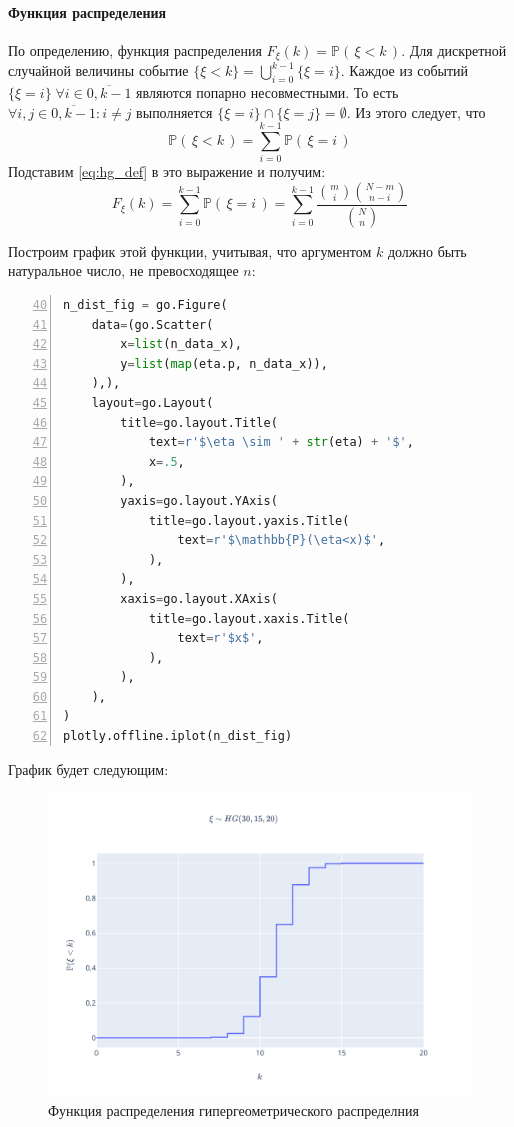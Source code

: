 \documentclass[
  russian,
  a4paper,
]{article}
\let\oldparagraph\paragraph
\renewcommand{\paragraph}[1]{\oldparagraph{#1}\mbox{}}
\begin{document}
\hypertarget{ux444ux443ux43dux43aux446ux438ux44f-ux440ux430ux441ux43fux440ux435ux434ux435ux43bux435ux43dux438ux44f}{%
\paragraph{Функция
распределения}\label{ux444ux443ux43dux43aux446ux438ux44f-ux440ux430ux441ux43fux440ux435ux434ux435ux43bux435ux43dux438ux44f}}

По определению, функция распределения
\(F_\xi(k) = \mathbb{P}\left(\, \xi < k \,\right)\). Для дискретной
случайной величины событие
\(\{\xi < k\} = \bigcup\limits_{i=0}^{k-1}\{\xi=i\}\). Каждое из событий
\(\{\xi=i\}\; \forall i \in \overline{0, k-1}\) являются попарно
несовместными. То есть \(\forall i,j \in \overline{0, k-1}: i \neq j\)
выполняется \(\{\xi=i\}\cap\{\xi=j\}=\emptyset\). Из этого следует, что
\[\mathbb{P}\left(\, \xi < k \,\right) = \sum_{i=0}^{k-1}\mathbb{P}\left(\, \xi = i \,\right)\]
Подставим \ref{eq:hg_def} в это выражение и получим: \[F_\xi(k)
= \sum_{i=0}^{k-1}\mathbb{P}\left(\, \xi = i \,\right)
= \sum_{i=0}^{k-1}\frac{\binom{m}{i}\binom{N-m}{n-i}}{\binom{N}{n}}\]

Построим график этой функции, учитывая, что аргументом \(k\) должно быть
натуральное число, не превосходящее \(n\):

\begin{lstlisting}[language=Python, numbers=left, firstnumber=40]
n_dist_fig = go.Figure(
    data=(go.Scatter(
        x=list(n_data_x),
        y=list(map(eta.p, n_data_x)),
    ),),
    layout=go.Layout(
        title=go.layout.Title(
            text=r'$\eta \sim ' + str(eta) + '$',
            x=.5,
        ),
        yaxis=go.layout.YAxis(
            title=go.layout.yaxis.Title(
                text=r'$\mathbb{P}(\eta<x)$',
            ),
        ),
        xaxis=go.layout.XAxis(
            title=go.layout.xaxis.Title(
                text=r'$x$',
            ),
        ),
    ),
)
plotly.offline.iplot(n_dist_fig)
\end{lstlisting}

График будет следующим:

\begin{figure}
\centering
\includegraphics{../assets/hg_dist.svg}
\caption{Функция распределения гипергеометрического распределния}
\end{figure}
\end{document}
